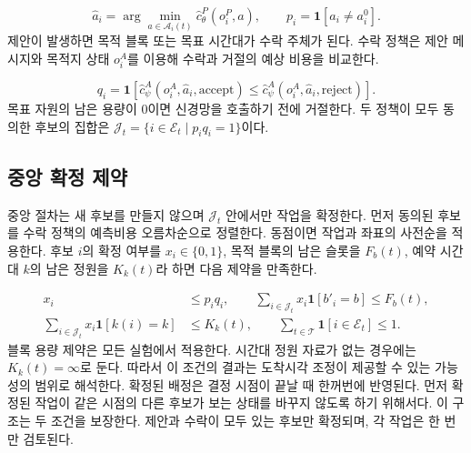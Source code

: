 \begin{equation}
\hat a_i=\arg\min_{a\in\mathcal A_i(t)}
\hat c_{\theta}^{P}(o_i^P,a),\qquad
p_i=\mathbf 1[\hat a_i\ne a_i^0].
\end{equation}
제안이 발생하면 목적 블록 또는 목표 시간대가 수락 주체가 된다. 수락 정책은 제안
메시지와 목적지 상태 $o_i^A$를 이용해 수락과 거절의 예상 비용을 비교한다.

\begin{equation}
q_i=\mathbf 1\!\left[
\hat c_{\psi}^{A}(o_i^A,\hat a_i,\mathrm{accept})
\le
\hat c_{\psi}^{A}(o_i^A,\hat a_i,\mathrm{reject})
\right].
\end{equation}
목표 자원의 남은 용량이 0이면 신경망을 호출하기 전에 거절한다. 두 정책이 모두 동의한
후보의 집합은 $\mathcal J_t=\{i\in\mathcal E_t\mid p_iq_i=1\}$이다.

\subsection{중앙 확정 제약}
\label{sec:arch-commit}
중앙 절차는 새 후보를 만들지 않으며 $\mathcal J_t$ 안에서만 작업을 확정한다. 먼저
동의된 후보를 수락 정책의 예측비용 오름차순으로 정렬한다. 동점이면 작업과 좌표의
사전순을 적용한다. 후보 $i$의 확정 여부를 $x_i\in\{0,1\}$, 목적 블록의 남은 슬롯을
$F_b(t)$, 예약 시간대 $k$의 남은 정원을 $K_k(t)$라 하면 다음 제약을 만족한다.

\begin{equation}
\begin{aligned}
x_i&\le p_iq_i,\qquad
\sum_{i\in\mathcal J_t}\!x_i\mathbf1[b'_i\!=\!b]\le F_b(t),\\
\sum_{i\in\mathcal J_t}\!x_i\mathbf1[k(i)\!=\!k]&\le K_k(t),\qquad
\sum_{t\in\mathcal T}\!\mathbf1[i\in\mathcal E_t]\le1.
\end{aligned}
\end{equation}
블록 용량 제약은 모든 실험에서 적용한다. 시간대 정원 자료가 없는 경우에는
$K_k(t)=\infty$로 둔다. 따라서 이 조건의 결과는 도착시각 조정이 제공할 수 있는 가능성의
범위로 해석한다. 확정된 배정은 결정 시점이 끝날 때 한꺼번에 반영된다. 먼저 확정된
작업이 같은 시점의 다른 후보가 보는 상태를 바꾸지 않도록 하기 위해서다. 이 구조는 두
조건을 보장한다. 제안과 수락이 모두 있는 후보만 확정되며, 각 작업은 한 번만 검토된다.

